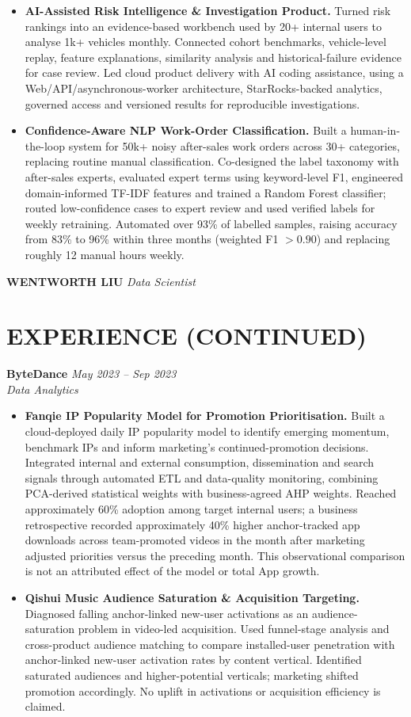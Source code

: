 \documentclass[a4paper,10pt]{article}
\begin{document}
\begin{itemize}
\item \textbf{AI-Assisted Risk Intelligence \& Investigation Product.} Turned risk rankings into an evidence-based workbench used by 20+ internal users to analyse 1k+ vehicles monthly. Connected cohort benchmarks, vehicle-level replay, feature explanations, similarity analysis and historical-failure evidence for case review. Led cloud product delivery with AI coding assistance, using a Web/API/asynchronous-worker architecture, StarRocks-backed analytics, governed access and versioned results for reproducible investigations.
\item \textbf{Confidence-Aware NLP Work-Order Classification.} Built a human-in-the-loop system for 50k+ noisy after-sales work orders across 30+ categories, replacing routine manual classification. Co-designed the label taxonomy with after-sales experts, evaluated expert terms using keyword-level F1, engineered domain-informed TF-IDF features and trained a Random Forest classifier; routed low-confidence cases to expert review and used verified labels for weekly retraining. Automated over 93\% of labelled samples, raising accuracy from 83\% to 96\% within three months (weighted F1 $>0.90$) and replacing roughly 12 manual hours weekly.
\end{itemize}

\newpage
\noindent\textbf{WENTWORTH LIU} \hfill \textit{Data Scientist}
\section{EXPERIENCE (CONTINUED)}
\textbf{ByteDance} \hfill \textit{May 2023 -- Sep 2023}\\
\textit{Data Analytics}
\begin{itemize}
\item \textbf{Fanqie IP Popularity Model for Promotion Prioritisation.} Built a cloud-deployed daily IP popularity model to identify emerging momentum, benchmark IPs and inform marketing's continued-promotion decisions. Integrated internal and external consumption, dissemination and search signals through automated ETL and data-quality monitoring, combining PCA-derived statistical weights with business-agreed AHP weights. Reached approximately 60\% adoption among target internal users; a business retrospective recorded approximately 40\% higher anchor-tracked app downloads across team-promoted videos in the month after marketing adjusted priorities versus the preceding month. This observational comparison is not an attributed effect of the model or total App growth.
\item \textbf{Qishui Music Audience Saturation \& Acquisition Targeting.} Diagnosed falling anchor-linked new-user activations as an audience-saturation problem in video-led acquisition. Used funnel-stage analysis and cross-product audience matching to compare installed-user penetration with anchor-linked new-user activation rates by content vertical. Identified saturated audiences and higher-potential verticals; marketing shifted promotion accordingly. No uplift in activations or acquisition efficiency is claimed.
\end{itemize}
\end{document}
